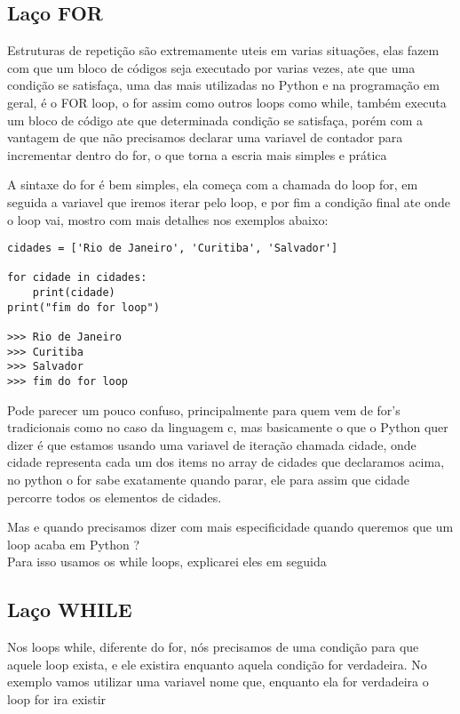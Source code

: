             \subsection{La\c{c}o FOR}
        Estruturas de repetição são extremamente uteis em varias situações, elas fazem com que um bloco de códigos seja executado por varias vezes, ate que uma condição se satisfaça, uma das mais utilizadas no Python e na programação em geral, é o FOR loop, o for assim como outros loops como while, também executa um bloco de código ate que determinada condição se satisfaça, porém com a vantagem de que não precisamos declarar uma variavel de contador para incrementar dentro do for, o que torna a escria mais simples e prática
        
        A sintaxe do for é bem simples, ela começa com a chamada do loop for, em seguida a variavel que iremos iterar pelo loop, e por fim a condição final ate onde o loop vai, mostro com mais detalhes nos exemplos abaixo: 

\begin{lstlisting}
cidades = ['Rio de Janeiro', 'Curitiba', 'Salvador']

for cidade in cidades:
    print(cidade)
print("fim do for loop")

>>> Rio de Janeiro
>>> Curitiba
>>> Salvador
>>> fim do for loop

\end{lstlisting}

Pode parecer um pouco confuso, principalmente para quem vem de for's tradicionais como no caso da linguagem c, mas basicamente o que o Python quer dizer é que estamos usando uma variavel de iteração chamada cidade, onde cidade representa cada um dos items no array de cidades que declaramos acima, no python o for sabe exatamente quando parar, ele para assim que cidade percorre todos os elementos de cidades.

Mas e quando precisamos dizer com mais especificidade quando queremos que um loop acaba em Python ? \\
Para isso usamos os while loops, explicarei eles em seguida
        
            \subsection{La\c{c}o WHILE}
        Nos loops while, diferente do for, nós precisamos de uma condição para que aquele loop exista, e ele existira enquanto aquela condição for verdadeira. No exemplo vamos utilizar uma variavel nome que, enquanto ela for verdadeira o loop for ira existir
        
